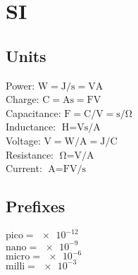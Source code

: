 \section{SI}
\subsection*{Units}
Power: $\unit{\watt}=\unit{\joule\per\second}=\unit{\volt\ampere}$\\
Charge: $\unit{\coulomb}=\unit{\ampere\second}=\unit{\farad\volt}$\\
Capacitance: $\unit{\farad}=\unit{\coulomb\per\volt}=\unit{\second\per\ohm}$\\
Inductance: $\unit{\henry}=\unit{\volt\second\per\ampere}$\\
Voltage: $\unit{\volt}=\unit{\watt\per\ampere}=\unit{\joule\per\coulomb}$\\
Resistance: $\unit{\ohm}=\unit{\volt\per\ampere}$\\
Current: $\unit{\ampere}=\unit{\farad\volt\per\second}$
\subsection*{Prefixes}
$\text{pico}=\num{e-12}$\\
$\text{nano}=\num{e-9}$\\
$\text{micro}=\num{e-6}$\\
$\text{milli}=\num{e-3}$\\
